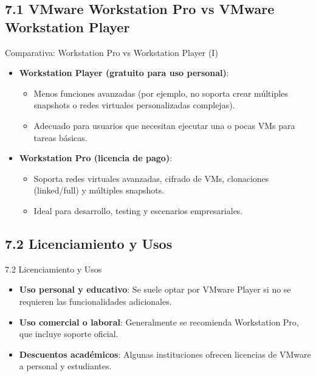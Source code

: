 \documentclass{beamer}
\begin{document}
\subsection{7.1 VMware Workstation Pro vs VMware Workstation Player}
\begin{frame}{Comparativa: Workstation Pro vs Workstation Player (I)}
    \begin{itemize}
        \item \textbf{Workstation Player (gratuito para uso personal)}:
            \begin{itemize}
                \item Menos funciones avanzadas (por ejemplo, no soporta crear múltiples snapshots o redes virtuales personalizadas complejas).
                \item Adecuado para usuarios que necesitan ejecutar una o pocas VMs para tareas básicas.
            \end{itemize}
        \item \textbf{Workstation Pro (licencia de pago)}:
            \begin{itemize}
                \item Soporta redes virtuales avanzadas, cifrado de VMs, clonaciones (linked/full) y múltiples snapshots.
                \item Ideal para desarrollo, testing y escenarios empresariales.
            \end{itemize}
    \end{itemize}
\end{frame}

\subsection{7.2 Licenciamiento y Usos}
\begin{frame}{7.2 Licenciamiento y Usos}
    \begin{itemize}
        \item \textbf{Uso personal y educativo}: Se suele optar por VMware Player si no se requieren las funcionalidades adicionales.
        \item \textbf{Uso comercial o laboral}: Generalmente se recomienda Workstation Pro, que incluye soporte oficial.
        \item \textbf{Descuentos académicos}: Algunas instituciones ofrecen licencias de VMware a personal y estudiantes.
    \end{itemize}
\end{frame}
\end{document}

